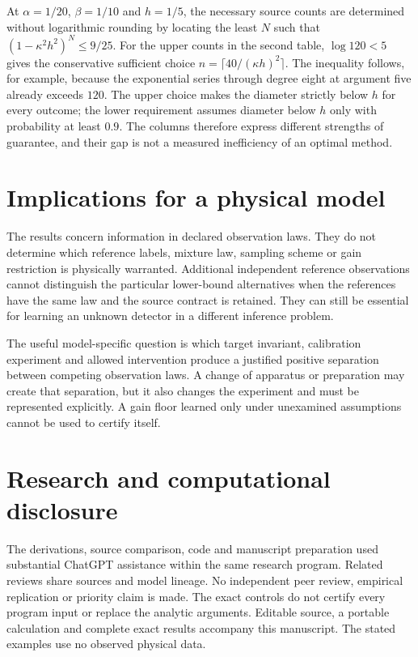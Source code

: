\documentclass[11pt,a4paper]{article}
\begin{document}


At $\alpha=1/20$, $\beta=1/10$ and $h=1/5$, the necessary source counts are determined without logarithmic rounding by locating the least $N$ such that
$(1-\kappa^2h^2)^N\le9/25$. For the upper counts in the second table, $\log120<5$ gives the conservative sufficient choice $n=\lceil40/(\kappa h)^2\rceil$. The inequality follows, for example, because the exponential series through degree eight at argument five already exceeds $120$. The upper choice makes the diameter strictly below $h$ for every outcome; the lower requirement assumes diameter below $h$ only with probability at least $0.9$. The columns therefore express different strengths of guarantee, and their gap is not a measured inefficiency of an optimal method.

\section{Implications for a physical model}

The results concern information in declared observation laws. They do not determine which reference labels, mixture law, sampling scheme or gain restriction is physically warranted. Additional independent reference observations cannot distinguish the particular lower-bound alternatives when the references have the same law and the source contract is retained. They can still be essential for learning an unknown detector in a different inference problem.

The useful model-specific question is which target invariant, calibration experiment and allowed intervention produce a justified positive separation between competing observation laws. A change of apparatus or preparation may create that separation, but it also changes the experiment and must be represented explicitly. A gain floor learned only under unexamined assumptions cannot be used to certify itself.

\section*{Research and computational disclosure}

The derivations, source comparison, code and manuscript preparation used substantial ChatGPT assistance within the same research program. Related reviews share sources and model lineage. No independent peer review, empirical replication or priority claim is made. The exact controls do not certify every program input or replace the analytic arguments. Editable source, a portable calculation and complete exact results accompany this manuscript. The stated examples use no observed physical data.
\end{document}
